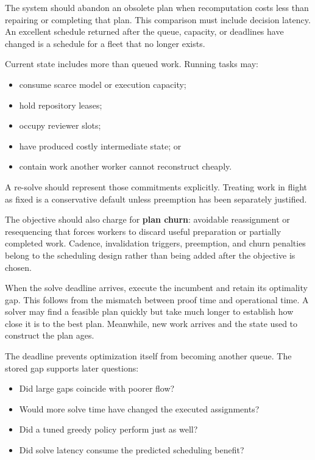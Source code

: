 The system should abandon an obsolete plan when recomputation costs less than repairing or completing that plan. This comparison must include decision latency. An excellent schedule returned after the queue, capacity, or deadlines have changed is a schedule for a fleet that no longer exists.


Current state includes more than queued work. Running tasks may:

\begin{itemize}
\tightlist
\item
  consume scarce model or execution capacity;
\item
  hold repository leases;
\item
  occupy reviewer slots;
\item
  have produced costly intermediate state; or
\item
  contain work another worker cannot reconstruct cheaply.
\end{itemize}

A re-solve should represent those commitments explicitly. Treating work in flight as fixed is a conservative default unless preemption has been separately justified.

The objective should also charge for \textbf{plan churn}: avoidable reassignment or resequencing that forces workers to discard useful preparation or partially completed work. Cadence, invalidation triggers, preemption, and churn penalties belong to the scheduling design rather than being added after the objective is chosen.

When the solve deadline arrives, execute the incumbent and retain its optimality gap. This follows from the mismatch between proof time and operational time. A solver may find a feasible plan quickly but take much longer to establish how close it is to the best plan. Meanwhile, new work arrives and the state used to construct the plan ages.


The deadline prevents optimization itself from becoming another queue. The stored gap supports later questions:

\begin{itemize}
\tightlist
\item
  Did large gaps coincide with poorer flow?
\item
  Would more solve time have changed the executed assignments?
\item
  Did a tuned greedy policy perform just as well?
\item
  Did solve latency consume the predicted scheduling benefit?
\end{itemize}

